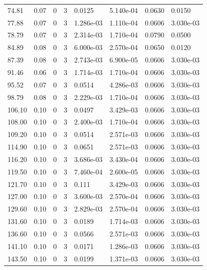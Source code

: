 \documentclass[preview]{standalone}
\begin{document}
{{\begin{tabular}{L{1.2cm}C{1.2cm} C{0.3cm}C{0.5cm} C{1.4cm}C{1.4cm} C{1.4cm}C{1.4cm}}
  74.81  &  0.07  & 0     &  3 &  0.0125  & 5.140e-04  & 0.0630 &  0.0150   \\ 
  77.88  &  0.07  & 0     &  3 &  1.286e-03  & 1.110e-04  & 0.0606 &  3.030e-03   \\ 
  78.79  &  0.07  & 0     &  3 &  2.314e-03  & 1.710e-04  & 0.0790 &  0.0500   \\ 
  84.89  &  0.08  & 0     &  3 &  6.000e-03  & 2.570e-04  & 0.0650 &  0.0120   \\ 
  87.39  &  0.08  & 0     &  3 &  2.743e-03  & 6.900e-05  & 0.0606 &  3.030e-03   \\ 
  91.46  &  0.06  & 0     &  3 &  1.714e-03  & 1.710e-04  & 0.0606 &  3.030e-03   \\ 
  95.52  &  0.07  & 0     &  3 &  0.0514  & 4.286e-03  & 0.0606 &  3.030e-03   \\ 
  98.79  &  0.08  & 0     &  3 &  2.229e-03  & 1.710e-04  & 0.0606 &  3.030e-03   \\ 
  106.10  &  0.10  & 0     &  3 &  0.0497  & 3.429e-03  & 0.0606 &  3.030e-03   \\ 
  108.00  &  0.10  & 0     &  3 &  2.400e-03  & 1.710e-04  & 0.0606 &  3.030e-03   \\ 
  109.20  &  0.10  & 0     &  3 &  0.0514  & 2.571e-03  & 0.0606 &  3.030e-03   \\ 
  114.90  &  0.10  & 0     &  3 &  0.0651  & 2.571e-03  & 0.0606 &  3.030e-03   \\ 
  116.20  &  0.10  & 0     &  3 &  3.686e-03  & 3.430e-04  & 0.0606 &  3.030e-03   \\ 
  119.50  &  0.10  & 0     &  3 &  7.460e-04  & 2.600e-05  & 0.0606 &  3.030e-03   \\ 
  121.70  &  0.10  & 0     &  3 &  0.111  & 3.429e-03  & 0.0606 &  3.030e-03   \\ 
  127.00  &  0.10  & 0     &  3 &  3.600e-03  & 2.570e-04  & 0.0606 &  3.030e-03   \\ 
  129.60  &  0.10  & 0     &  3 &  2.829e-03  & 2.570e-04  & 0.0606 &  3.030e-03   \\ 
  131.60  &  0.10  & 0     &  3 &  0.0189  & 1.714e-03  & 0.0606 &  3.030e-03   \\ 
  136.60  &  0.10  & 0     &  3 &  0.0566  & 2.571e-03  & 0.0606 &  3.030e-03   \\ 
  141.10  &  0.10  & 0     &  3 &  0.0171  & 1.286e-03  & 0.0606 &  3.030e-03   \\ 
  143.50  &  0.10  & 0     &  3 &  0.0199  & 1.371e-03  & 0.0606 &  3.030e-03   \\ 

\end{tabular}}}
\end{document}
